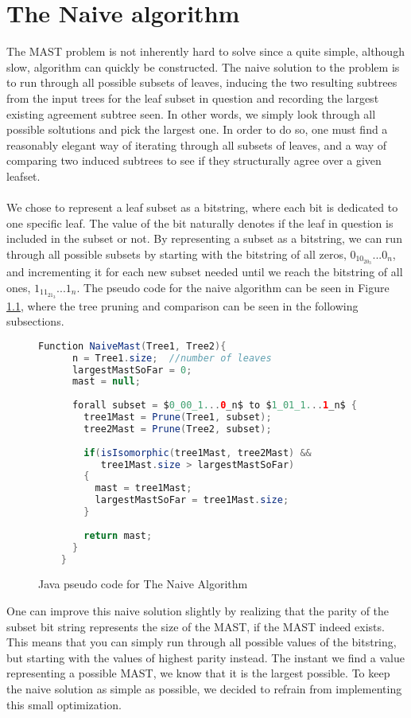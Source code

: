 \chapter{The Naive algorithm}
The MAST problem is not inherently hard to solve since a quite simple, although slow, algorithm can quickly be constructed. The naive solution to the problem is to run through all possible subsets of leaves, inducing the two resulting subtrees from the input trees for the leaf subset in question and recording the largest existing agreement subtree seen. In other words, we simply look through all possible soltutions and pick the largest one. In order to do so, one must find a reasonably elegant way of iterating through all subsets of leaves, and a way of comparing two induced subtrees to see if they structurally agree over a given leafset. 
\\
\\
We chose to represent a leaf subset as a bitstring, where each bit is dedicated to one specific leaf. The value of the bit naturally denotes if the leaf in question is included in the subset or not. By representing a subset as a bitstring, we can run through all possible subsets by starting with the bitstring of all zeros, $0_10_20_3...0_n$, and incrementing it for each new subset needed until we reach the bitstring of all ones, $1_11_21_3...1_n$. The pseudo code for the naive algorithm can be seen in Figure \ref{Code:Naive1}, where the tree pruning and comparison can be seen in the following subsections.

\begin{figure}
	\begin{lstlisting}[language=Java, mathescape]
	Function NaiveMast(Tree1, Tree2){
	  n = Tree1.size;  //number of leaves
	  largestMastSoFar = 0;
	  mast = null;
	  
	  forall subset = $0_00_1...0_n$ to $1_01_1...1_n$ {
	    tree1Mast = Prune(Tree1, subset);
	    tree2Mast = Prune(Tree2, subset);
	    
	    if(isIsomorphic(tree1Mast, tree2Mast) && 
	       tree1Mast.size > largestMastSoFar) 
	    {
	      mast = tree1Mast;
	      largestMastSoFar = tree1Mast.size;
	    }
	    
	    return mast;
	  }
	}
	\end{lstlisting}
	\caption{Java pseudo code for The Naive Algorithm}
	\label{Code:Naive1}
\end{figure}
One can improve this naive solution slightly by realizing that the parity of the subset bit string represents the size of the MAST, if the MAST indeed exists. This means that you can simply run through all possible values of the bitstring, but starting with the values of highest parity instead. The instant we find a value representing a possible MAST, we know that it is the largest possible. To keep the naive solution as simple as possible, we decided to refrain from implementing this small optimization.

